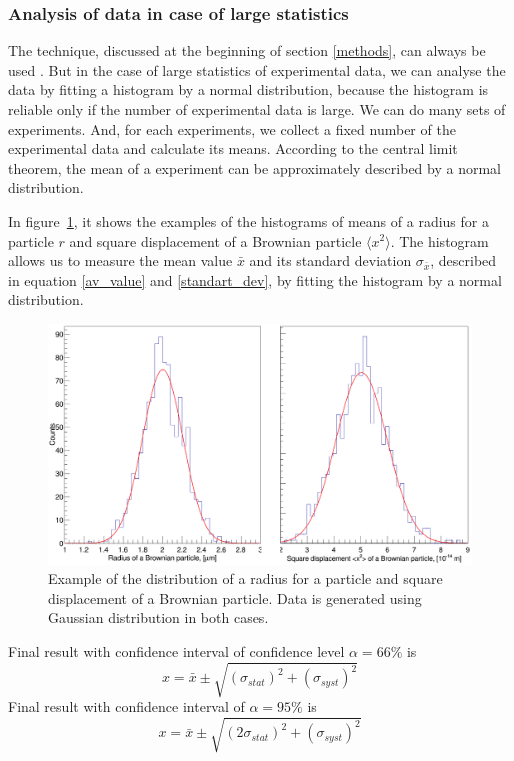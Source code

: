\documentclass[12pt,a4paper]{report}
\begin{document}
\subsubsection{Analysis of data in case of large statistics}
The technique, discussed at the beginning of section \ref{methods}, can always be used .
But in the case of large statistics of experimental data, we can analyse the data by fitting a histogram by a normal distribution, because the histogram is reliable only if the number of experimental data is large.
We can do many sets of experiments.
And, for each experiments, we collect a fixed number of the experimental data and calculate its means.
According to the central limit theorem, the mean of a experiment can be approximately described by a normal distribution.

In figure~\ref{fig:radius_distribution}, it shows the examples of the histograms of means of a radius for a particle $r$ and square displacement of a Brownian particle $\langle x^2 \rangle$.
The histogram allows us to measure the mean value $\bar{x}$ and its standard deviation $\sigma_{\bar{x}}$, described in equation \ref{av_value} and \ref{standart_dev}, by fitting the histogram by a normal distribution.

\begin{figure}[!h]
\begin{center}
\includegraphics*[scale = 0.25]{Figures/two_plots}
\caption{\label{fig:radius_distribution} Example of the distribution of a radius for a particle and square displacement of a Brownian particle. Data is generated using Gaussian distribution in both cases.}
\end{center}
\end{figure}

Final result with confidence interval of confidence level $\alpha = 66 \%$ is
\begin{equation}
x = \bar{x} \pm \sqrt{ (\sigma_{stat})^2 + (\sigma_{syst})^2 }
\end{equation}
Final result with confidence interval of $\alpha = 95 \%$ is
\begin{equation} \label{error_offline}
x = \bar{x} \pm \sqrt{ (2\sigma_{stat})^2 + (\sigma_{syst})^2}
\end{equation}
\end{document}
